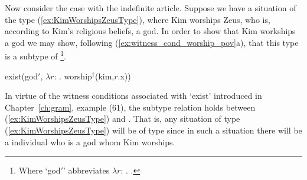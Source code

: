  
 
   
    


Now consider the case with the indefinite article.  Suppose we have a
situation of the type (\ref{ex:KimWorshipsZeusType}), where Kim
worships Zeus, who is, according to Kim's religious beliefs, a god.
In order to show that Kim workships a god we may
show, following (\ref{ex:witness_cond_worship_pov}a), that this type
is a subtype of \nexteg{}\footnote{Where `god$'$' abbreviates $\lambda
r$:
. .}.
\begin{ex} 
exist(god$'$, $\lambda r$:
. worship$^\dagger$(kim,$r$.x)) 
\end{ex} 
In virtue of the witness conditions associated with `exist'
introduced in Chapter~\ref{ch:gram}, example (61), the subtype relation
holds between (\ref{ex:KimWorshipsZeusType}) and \preveg{}.  That is,
any situation of type (\ref{ex:KimWorshipsZeusType}) will be of type
\preveg{} since in such a situation there will be a individual who is
a god whom Kim worships.

